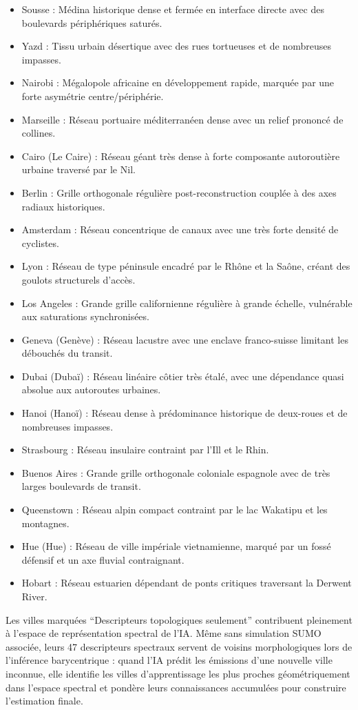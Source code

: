 \documentclass[10pt, a4paper]{article}
\begin{document}
\begin{itemize}
  Victoria (Seychelles) : Réseau insulaire compact à très faible étendue
  géographique.
\item
  Sousse : Médina historique dense et fermée en interface directe avec
  des boulevards périphériques saturés.
\item
  Yazd : Tissu urbain désertique avec des rues tortueuses et de
  nombreuses impasses.
\item
  Nairobi : Mégalopole africaine en développement rapide, marquée par
  une forte asymétrie centre/périphérie.
\item
  Marseille : Réseau portuaire méditerranéen dense avec un relief
  prononcé de collines.
\item
  Cairo (Le Caire) : Réseau géant très dense à forte composante
  autoroutière urbaine traversé par le Nil.
\item
  Berlin : Grille orthogonale régulière post-reconstruction couplée à
  des axes radiaux historiques.
\item
  Amsterdam : Réseau concentrique de canaux avec une très forte densité
  de cyclistes.
\item
  Lyon : Réseau de type péninsule encadré par le Rhône et la Saône,
  créant des goulots structurels d'accès.
\item
  Los Angeles : Grande grille californienne régulière à grande échelle,
  vulnérable aux saturations synchronisées.
\item
  Geneva (Genève) : Réseau lacustre avec une enclave franco-suisse
  limitant les débouchés du transit.
\item
  Dubai (Dubaï) : Réseau linéaire côtier très étalé, avec une dépendance
  quasi absolue aux autoroutes urbaines.
\item
  Hanoi (Hanoï) : Réseau dense à prédominance historique de deux-roues
  et de nombreuses impasses.
\item
  Strasbourg : Réseau insulaire contraint par l'Ill et le Rhin.
\item
  Buenos Aires : Grande grille orthogonale coloniale espagnole avec de
  très larges boulevards de transit.
\item
  Queenstown : Réseau alpin compact contraint par le lac Wakatipu et les
  montagnes.
\item
  Hue (Hue) : Réseau de ville impériale vietnamienne, marqué par un
  fossé défensif et un axe fluvial contraignant.
\item
  Hobart : Réseau estuarien dépendant de ponts critiques traversant la
  Derwent River.
\end{itemize}

Les villes marquées ``Descripteurs topologiques seulement'' contribuent
pleinement à l'espace de représentation spectral de l'IA. Même sans
simulation SUMO associée, leurs 47 descripteurs spectraux servent de
voisins morphologiques lors de l'inférence barycentrique : quand l'IA
prédit les émissions d'une nouvelle ville inconnue, elle identifie les
villes d'apprentissage les plus proches géométriquement dans l'espace
spectral et pondère leurs connaissances accumulées pour construire
l'estimation finale.
\end{document}
